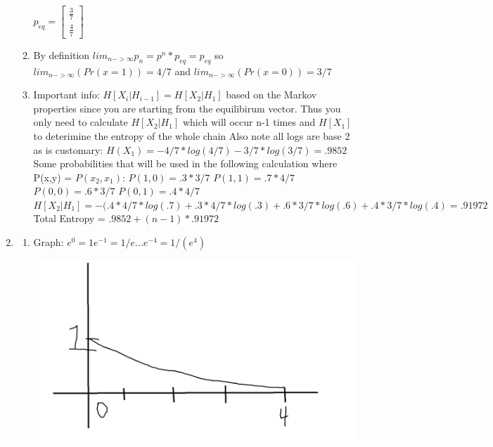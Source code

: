 \documentclass{article}
\begin{document}
\begin{enumerate}
\begin{enumerate}
				$p_{eq} = \begin{bmatrix}
				\frac{3}{7} \\
				\frac{4}{7}
				\end{bmatrix}$
			\item 
				By definition $lim_{n-> \infty}p_{n} = p^{n}*p_{eq}=p_{eq}$ so $lim_{n-> \infty}(Pr(x=1)) = 4/7$ and $lim_{n-> \infty}(Pr(x=0)) = 3/7$
			\item
				Important info: $H[X_{i}|H_{i-1}]=H[X_{2}|H_{1}]$ based on the Markov properties since you are starting from the equilibirum vector. Thus you only need to calculate $H[X_{2}|H_{1}]$ which will occur n-1 times and $H[X_{1}]$ to deterimine the entropy of the whole chain \newline
				Also note all logs are base 2 as is customary: \newline
				$H(X_{1}) = -4/7*log(4/7)-3/7*log(3/7) = .9852$ \newline
				Some probabilities that will be used in the following calculation where P(x,y) = $P(x_{2}, x_{1})$:  \newline
				$P(1, 0 ) = .3*3/7$ \newline
				$P(1, 1 ) = .7*4/7$ \newline
				$P(0, 0 ) = .6*3/7$ \newline 
				$P(0, 1 ) = .4*4/7$ \newline
				$H[X_{2}|H_{1}] = -(.4*4/7*log(.7) + .3*4/7*log(.3)+.6*3/7*log(.6)+.4*3/7*log(.4) = .91972$ \newline
				Total Entropy = $.9852 + (n-1)*.91972$
		\end{enumerate}
		\item
		\begin{enumerate}
			\item Graph: $e^{0} = 1 e^{-1} = 1/e ... e^{-4} = 1/(e^{4})$ \newline
				 \begin{minipage}{\linewidth}
				 	\centering
						\includegraphics[scale=.5]{graph}

\end{minipage}
\end{enumerate}
\end{enumerate}
\end{document}
